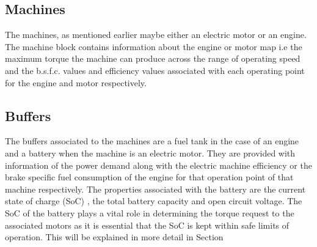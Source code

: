 \documentclass[ExampleMasters.tex]{subfiles}
\begin{document}
\subsection{Machines}\label{sec:machinestructure}
The machines, as mentioned earlier maybe either an electric motor or an engine. The machine block contains information about the engine or motor map i.e the maximum torque the machine can produce across the range of operating speed and the b.s.f.c. values and efficiency values associated with each operating point for the engine and motor respectively.  

\subsection{Buffers} \label{sec:bufferstructure}
The buffers associated to the machines are a fuel tank in the case of an engine and a battery when the machine is an electric motor. They are provided with information of the power demand along with the electric machine efficiency or the brake specific fuel consumption of the engine for that operation point of that machine respectively.  
The properties associated with the battery are the current state of charge (SoC) , the total battery capacity and open circuit voltage. The SoC of the battery plays a vital role in determining the torque request to the associated motors as it is essential that the SoC is kept within safe limits of operation. This will be explained in more detail in Section %
\end{document}
